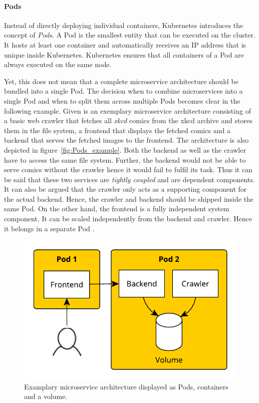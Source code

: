\paragraph{Pods}%
\label{par:Pods}
Instead of directly deploying individual containers, Kubernetes introduces the
concept of \textit{Pods}. A Pod is the smallest entity that can be executed on
the cluster. It hosts at least one container and automatically receives an
\ac{IP} address that is unique inside Kubernetes. Kubernetes ensures that all
containers of a Pod are always executed on the same node.

Yet, this does not mean that a complete microservice architecture should be
bundled into a single Pod. The decision when to combine microservices into a
single Pod and when to split them across multiple Pods becomes clear in the
following example. Given is an exemplary microservice architecture consisting
of a basic web crawler that fetches all \textit{xkcd} comics from the xkcd
archive and stores them in the file system, a frontend that displays the
fetched comics and a backend that serves the fetched images to the frontend.
The architecture is also depicted in figure~\ref{fig:Pods_example}. Both the
backend as well as the crawler have to access the same file system. Further,
the backend would not be able to serve comics without the crawler hence it
would fail to fulfil its task. Thus it can be said that these two services are
\textit{tightly coupled} and are dependent components. It can also be argued
that the crawler only acts as a supporting component for the actual backend.
Hence, the crawler and backend should be shipped inside the same Pod. On the
other hand, the frontend is a fully independent system component. It can be
scaled independently from the backend and crawler. Hence it belongs in a
separate Pod \autocite[Ch. 3]{LuksaKubernetesAction2017}. 

\begin{figure}[H]
\begin{center}
  \includegraphics[scale=0.7]{images/figures/pod_example.pdf}
\end{center}
\caption{Examplary microservice architecture displayed as Pods, containers and a volume.}%
\label{fig:pods_example}
\end{figure}

